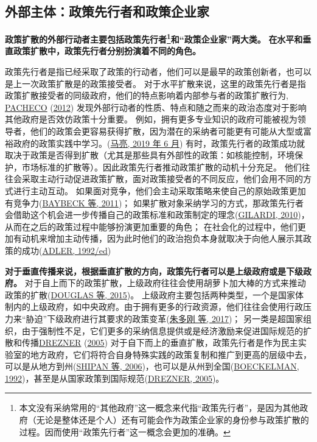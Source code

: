 \documentclass[
  12pt,
]{ctexart}
\begin{document}
\hypertarget{ux5916ux90e8ux4e3bux4f53ux653fux7b56ux5148ux884cux8005ux548cux653fux7b56ux4f01ux4e1aux5bb6}{%
\subsection{外部主体：政策先行者和政策企业家}\label{ux5916ux90e8ux4e3bux4f53ux653fux7b56ux5148ux884cux8005ux548cux653fux7b56ux4f01ux4e1aux5bb6}}

\textbf{政策扩散的外部行动者主要包括政策先行者\footnote{本文没有采纳常用的``其他政府''这一概念来代指``政策先行者''，是因为其他政府（无论是整体还是个人）还有可能会作为政策企业家的身份参与政策扩散的过程。因而使用``政策先行者''这一概念会更加的准确。}和``政策企业家''两大类。}
\textbf{在水平和垂直政策扩散中，政策先行者分别扮演着不同的角色。}

政策先行者是指已经采取了政策的行动者，他们可以是最早的政策创新者，也可以是上一次政策扩散是的政策接受者。
对于水平扩散来说，这里的政策先行者是指政策扩散接受者的同级政府，他们的特点影响着内部参与者的政策扩散行为,
\protect\hyperlink{ref-Pacheco2012a}{PACHECO} (\protect\hyperlink{ref-Pacheco2012a}{2012}) 发现外部行动者的性质、特点和随之而来的政治态度对于影响其他政府是否效仿政策十分重要。
例如，拥有更多专业知识的政府可能被视为领导者，他们的政策会更容易获得扩散，因为潜在的采纳者可能更有可能从大型或富裕政府的政策实践中学习。(\protect\hyperlink{ref-MaLiang2019}{马亮, 2019 年 6 月})
有时，政策先行者的政策成功就取决于政策是否得到扩散（尤其是那些具有外部性的政策：如核能控制，环境保护，市场标准的扩散等）。因此政策先行者推动政策扩散的动机十分充足。
他们往往会采取主动行动促进政策扩散，面对政策接受者的不同反应，他们会用不同的方式进行主动互动。
如果面对竞争，他们会主动采取策略来使自己的原始政策更加有竞争力(\protect\hyperlink{ref-BaybeckEtAl2011}{BAYBECK 等, 2011})；
如果扩散对象采纳学习的方式，那政策先行者会借助这个机会进一步传播自己的政策标准和政策制定的理念(\protect\hyperlink{ref-Gilardi2010b}{GILARDI, 2010})，从而在之后的政策过程中能够扮演更加重要的角色；
在社会化的过程中，他们更加有动机来增加主动传播，因为此时他们的政治抱负本身就取决于向他人展示其政策的成功(\protect\hyperlink{ref-Adler1992}{ADLER, 1992/ed})

\textbf{对于垂直传播来说，根据垂直扩散的方向，政策先行者可以是上级政府或是下级政府。}
对于自上而下的政策扩散，上级政府往往会使用胡萝卜加大棒的方式来推动政策的扩散(\protect\hyperlink{ref-DouglasEtAl2015}{DOUGLAS 等, 2015})。
上级政府主要包括两种类型，一个是国家体制内的上级政府，如中央政府。由于拥有更多的行政资源，他们往往会使用行政压力来``胁迫''下级政府进行其要求的政策变革(\protect\hyperlink{ref-ZhuDuoGangHuZhenJi2017}{朱多刚 等, 2017})；
另一类是超国家组织，由于强制性不足，它们更多的采纳信息提供或是经济激励来促进国际规范的扩散和传播\protect\hyperlink{ref-Drezner2005}{DREZNER} (\protect\hyperlink{ref-Drezner2005}{2005})
对于自下而上的垂直扩散，政策先行者是作为民主实验室的地方政府，它们将符合自身特殊实践的政策复制和推广到更高的层级中去，可以是从地方到州(\protect\hyperlink{ref-ShipanVolden2006}{SHIPAN 等, 2006})，也可以是从州到全国(\protect\hyperlink{ref-Boeckelman1992}{BOECKELMAN, 1992})，甚至是从国家政策到国际规范(\protect\hyperlink{ref-Drezner2005}{DREZNER, 2005})。
\end{document}
